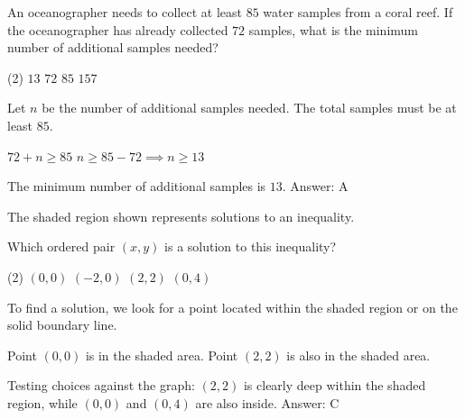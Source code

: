 \documentclass[11pt,paper=a4,answers]{exam}
\begin{document}
\begin{questions}
\question
An oceanographer needs to collect at least $85$ water samples from a coral reef. If the oceanographer has already collected $72$ samples, what is the minimum number of additional samples needed?
\begin{tasks}(2)
\task $13$
\task $72$
\task $85$
\task $157$
\end{tasks}

\begin{solution}
Let $n$ be the number of additional samples needed. The total samples must be at least $85$.
\vspace{5pt}
\begin{center}
$72 + n \geq 85$
\vspace{5pt}
$n \geq 85 - 72 \implies n \geq 13$
\end{center}
\vspace{5pt}
The minimum number of additional samples is $13$.
\vspace{5pt}
Answer: \colorbox{yellow!100}{A}
\end{solution}

\vspace{1cm}

\question
The shaded region shown represents solutions to an inequality.
\begin{center}
\end{center}
Which ordered pair $(x, y)$ is a solution to this inequality?
\begin{tasks}(2)
\task $(0, 0)$
\task $(-2, 0)$
\task $(2, 2)$
\task $(0, 4)$
\end{tasks}

\begin{solution}
To find a solution, we look for a point located within the shaded region or on the solid boundary line.
\vspace{5pt}
\begin{center}
Point $(0, 0)$ is in the shaded area.
\vspace{5pt}
Point $(2, 2)$ is also in the shaded area.
\end{center}
\vspace{5pt}
Testing choices against the graph: $(2, 2)$ is clearly deep within the shaded region, while $(0, 0)$ and $(0, 4)$ are also inside.
\vspace{5pt}
Answer: \colorbox{yellow!100}{C}
\end{solution}


\end{questions}
\end{document}
